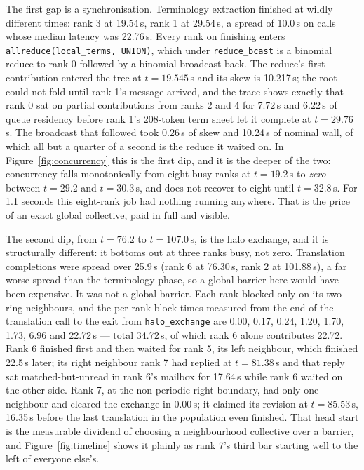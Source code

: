 \documentclass[11pt]{article}
\begin{document}
The first gap is a synchronisation. Terminology extraction finished at wildly different
times: rank 3 at 19.54\,s, rank 1 at 29.54\,s, a spread of 10.0\,s on calls whose median
latency was 22.76\,s. Every rank on finishing enters
\texttt{allreduce(local\_terms, UNION)}, which under \texttt{reduce\_bcast} is a binomial
reduce to rank 0 followed by a binomial broadcast back. The reduce's first contribution
entered the tree at $t=19.545$\,s and its skew is 10.217\,s; the root could not fold
until rank 1's message arrived, and the trace shows exactly that --- rank 0 sat on
partial contributions from ranks 2 and 4 for 7.72\,s and 6.22\,s of queue residency
before rank 1's 208-token term sheet let it complete at $t=29.76$\,s. The broadcast
that followed took 0.26\,s of skew and 10.24\,s of nominal wall, of which all but a
quarter of a second is the reduce it waited on. In Figure~\ref{fig:concurrency} this is
the first dip, and it is the deeper of the two: concurrency falls monotonically from
eight busy ranks at $t=19.2$\,s to \emph{zero} between $t=29.2$ and $t=30.3$\,s, and does
not recover to eight until $t=32.8$\,s. For 1.1 seconds this eight-rank job had nothing
running anywhere. That is the price of an exact global collective, paid in full and
visible.

The second dip, from $t=76.2$ to $t=107.0$\,s, is the halo exchange, and it is
structurally different: it bottoms out at three ranks busy, not zero. Translation
completions were spread over 25.9\,s (rank 6 at 76.30\,s, rank 2 at 101.88\,s), a far
worse spread than the terminology phase, so a global barrier here would have been
expensive. It was not a global barrier. Each rank blocked only on its two ring
neighbours, and the per-rank block times measured from the end of the translation call
to the exit from \texttt{halo\_exchange} are 0.00, 0.17, 0.24, 1.20, 1.70, 1.73, 6.96 and
22.72\,s --- total 34.72\,s, of which rank 6 alone contributes 22.72. Rank 6 finished
first and then waited for rank 5, its left neighbour, which finished 22.5\,s later; its
right neighbour rank 7 had replied at $t=81.38$\,s and that reply sat matched-but-unread
in rank 6's mailbox for 17.64\,s while rank 6 waited on the other side. Rank 7, at the
non-periodic right boundary, had only one neighbour and cleared the exchange in 0.00\,s;
it claimed its revision at $t=85.53$\,s, 16.35\,s before the last translation in the
population even finished. That head start is the measurable dividend of choosing a
neighbourhood collective over a barrier, and Figure~\ref{fig:timeline} shows it plainly
as rank 7's third bar starting well to the left of everyone else's.
\end{document}
